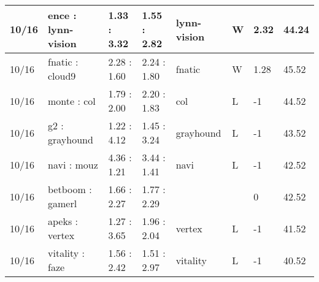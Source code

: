 \begin{small}
\begin{longtable}{|l|l|l|l|l|l|l|l|}
	10/16                               & ence : lynn-vision                  & 1.33 : 3.32                             & 1.55 : 2.82                             & lynn-vision                       & W                                 & 2.32                                 & 44.24                             \\ \hline
	10/16                               & fnatic : cloud9                     & 2.28 : 1.60                             & 2.24 : 1.80                             & fnatic                            & W                                 & 1.28                                 & 45.52                             \\ \hline
	10/16                               & monte : col                         & 1.79 : 2.00                             & 2.20 : 1.83                             & col                               & L                                 & -1                                   & 44.52                             \\ \hline
	10/16                               & g2 : grayhound                      & 1.22 : 4.12                             & 1.45 : 3.24                             & grayhound                         & L                                 & -1                                   & 43.52                             \\ \hline
	10/16                               & navi : mouz                         & 4.36 : 1.21                             & 3.44 : 1.41                             & navi                              & L                                 & -1                                   & 42.52                             \\ \hline
	10/16                               & betboom : gamerl                    & 1.66 : 2.27                             & 1.77 : 2.29                             &                                   &                                   & 0                                    & 42.52                             \\ \hline
	10/16                               & apeks : vertex                      & 1.27 : 3.65                             & 1.96 : 2.04                             & vertex                            & L                                 & -1                                   & 41.52                             \\ \hline
	10/16                               & vitality : faze                     & 1.56 : 2.42                             & 1.51 : 2.97                             & vitality                          & L                                 & -1                                   & 40.52                             \\ \hline

\end{longtable}
\end{small}
